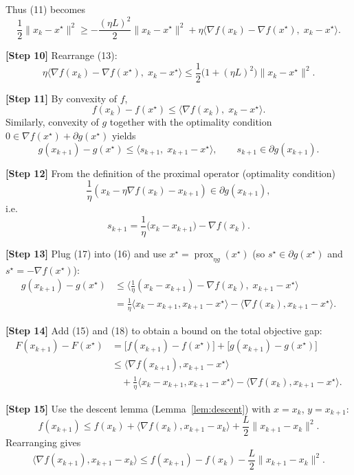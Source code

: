 \documentclass{article}
\newcommand{\prox}{\operatorname{prox}}
\begin{document}
Thus (11) becomes
\[
\frac{1}{2}\|x_k-x^\star\|^2
\ge -\frac{(\eta L)^2}{2}\|x_k-x^\star\|^2
+\eta\langle \nabla f(x_k)-\nabla f(x^\star),\;x_k-x^\star\rangle .
\tag{13}
\]

\noindent\textbf{[Step 10]} Rearrange (13):
\[
\eta\langle \nabla f(x_k)-\nabla f(x^\star),\;x_k-x^\star\rangle
\le \frac{1}{2}\bigl(1+(\eta L)^2\bigr)\|x_k-x^\star\|^2 .
\tag{14}
\]

\noindent\textbf{[Step 11]} By convexity of $f$,
\[
f(x_k)-f(x^\star)\le \langle \nabla f(x_k),\;x_k-x^\star\rangle .
\tag{15}
\]
Similarly, convexity of $g$ together with the optimality condition $0\in \nabla f(x^\star)+\partial g(x^\star)$ yields
\[
g(x_{k+1})-g(x^\star)\le \langle s_{k+1},\;x_{k+1}-x^\star\rangle,
\qquad s_{k+1}\in\partial g(x_{k+1}).
\tag{16}
\]

\noindent\textbf{[Step 12]} From the definition of the proximal operator (optimality condition)
\[
\frac{1}{\eta}(x_k-\eta\nabla f(x_k)-x_{k+1})\in\partial g(x_{k+1}),
\]
i.e.
\[
s_{k+1}= \frac{1}{\eta}\bigl(x_k-x_{k+1}\bigr)-\nabla f(x_k).
\tag{17}
\]

\noindent\textbf{[Step 13]} Plug (17) into (16) and use $x^\star=\prox_{\eta g}(x^\star)$ (so $s^\star\in\partial g(x^\star)$ and $s^\star=-\nabla f(x^\star)$):
\[
\begin{aligned}
g(x_{k+1})-g(x^\star)
&\le \Big\langle \frac{1}{\eta}(x_k-x_{k+1})-\nabla f(x_k),\;x_{k+1}-x^\star\Big\rangle \\
&= \frac{1}{\eta}\langle x_k-x_{k+1},x_{k+1}-x^\star\rangle
-\langle \nabla f(x_k),x_{k+1}-x^\star\rangle .
\end{aligned}
\tag{18}
\]

\noindent\textbf{[Step 14]} Add (15) and (18) to obtain a bound on the total objective gap:
\[
\begin{aligned}
F(x_{k+1})-F(x^\star)
&= \bigl[f(x_{k+1})-f(x^\star)\bigr]+\bigl[g(x_{k+1})-g(x^\star)\bigr] \\
&\le \langle \nabla f(x_{k+1}),x_{k+1}-x^\star\rangle \\
&\quad +\frac{1}{\eta}\langle x_k-x_{k+1},x_{k+1}-x^\star\rangle
-\langle \nabla f(x_k),x_{k+1}-x^\star\rangle .
\end{aligned}
\tag{19}
\]

\noindent\textbf{[Step 15]} Use the descent lemma (Lemma~\ref{lem:descent}) with $x=x_k$, $y=x_{k+1}$:
\[
f(x_{k+1})\le f(x_k)+\langle \nabla f(x_k),x_{k+1}-x_k\rangle
+\frac{L}{2}\|x_{k+1}-x_k\|^2 .
\tag{20}
\]
Rearranging gives
\[
\langle \nabla f(x_{k+1}),x_{k+1}-x_k\rangle
\le f(x_{k+1})-f(x_k)-\frac{L}{2}\|x_{k+1}-x_k\|^2 .
\tag{21}
\]
\end{document}
